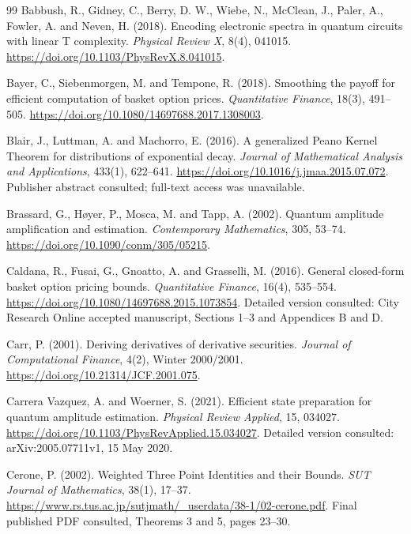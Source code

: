 \documentclass[11pt]{article}
\begin{document}
\begin{thebibliography}{99}
 Babbush, R., Gidney, C., Berry, D. W., Wiebe, N., McClean, J., Paler, A., Fowler, A. and Neven, H. (2018). Encoding electronic spectra in quantum circuits with linear T complexity. \emph{Physical Review X}, 8(4), 041015. \url{https://doi.org/10.1103/PhysRevX.8.041015}.

 Bayer, C., Siebenmorgen, M. and Tempone, R. (2018). Smoothing the payoff for efficient computation of basket option prices. \emph{Quantitative Finance}, 18(3), 491--505. \url{https://doi.org/10.1080/14697688.2017.1308003}.

 Blair, J., Luttman, A. and Machorro, E. (2016). A generalized Peano Kernel Theorem for distributions of exponential decay. \emph{Journal of Mathematical Analysis and Applications}, 433(1), 622--641. \url{https://doi.org/10.1016/j.jmaa.2015.07.072}. Publisher abstract consulted; full-text access was unavailable.

 Brassard, G., H\o yer, P., Mosca, M. and Tapp, A. (2002). Quantum amplitude amplification and estimation. \emph{Contemporary Mathematics}, 305, 53--74. \url{https://doi.org/10.1090/conm/305/05215}.

Caldana, R., Fusai, G., Gnoatto, A. and Grasselli, M. (2016).
General closed-form basket option pricing bounds.
\emph{Quantitative Finance}, 16(4), 535--554.
\url{https://doi.org/10.1080/14697688.2015.1073854}. Detailed version consulted: City Research Online accepted manuscript, Sections 1--3 and Appendices B and D.

 Carr, P. (2001). Deriving derivatives of derivative securities. \emph{Journal of Computational Finance}, 4(2), Winter 2000/2001. \url{https://doi.org/10.21314/JCF.2001.075}.

Carrera Vazquez, A. and Woerner, S. (2021). Efficient state preparation for quantum amplitude estimation.
\emph{Physical Review Applied}, 15, 034027. \url{https://doi.org/10.1103/PhysRevApplied.15.034027}.
Detailed version consulted: arXiv:2005.07711v1, 15 May 2020.

 Cerone, P. (2002). Weighted Three Point Identities and their Bounds. \emph{SUT Journal of Mathematics}, 38(1), 17--37. \url{https://www.rs.tus.ac.jp/sutjmath/_userdata/38-1/02-cerone.pdf}. Final published PDF consulted, Theorems 3 and 5, pages 23--30.


\end{thebibliography}
\end{document}
